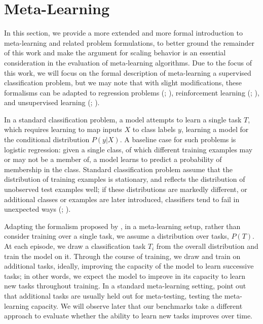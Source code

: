 \chapter{Meta-Learning\label{ch:meta-learning}}

In this section, we provide a more extended and more formal introduction to meta-learning and related problem formulations, to better ground the remainder of this work and make the argument for scaling behavior is an essential consideration in the evaluation of meta-learning algorithms. Due to the focus of this work, we will focus on the formal description of meta-learning a supervised classification problem, but we may note that with slight modifications, these formalisms can be adapted to regression problems (\cite{Finn2017}; \cite{Garg2016}), reinforcement learning (\cite{Wang2016}; \cite{Duan2017}), and unsupervised learning (\cite{Garg2018}; \cite{Hsu2019}).

In a standard classification problem, a model attempts to learn a single task $T$, which requires learning to map inputs $X$ to class labels $y$, learning a model for the conditional distribution $P(y | X)$. A baseline case for such problems is logistic regression: given a single class, of which different training examples may or may not be a member of, a model learns to predict a probability of membership in the class. Standard classification problem assume that the distribution of training examples is stationary, and reflects the distribution of unobserved test examples well; if these distributions are markedly different, or additional classes or examples are later introduced, classifiers tend to fail in unexpected ways (\cite{Amodei2016}; \cite{Hu2018}). 

Adapting the formalism proposed by \textcite{Finn2017}, in a meta-learning setup, rather than consider training over a single task, we assume a distribution over tasks, $P(T)$. At each episode, we draw a classification task $T_i$ from the overall distribution and train the model on it. Through the course of training, we draw and train on additional tasks, ideally, improving the capacity of the model to learn successive tasks; in other words, we expect the model to improve in its capacity to learn new tasks throughout training. In a standard meta-learning setting, \textcite{Finn2017} point out that additional tasks are usually held out for meta-testing, testing the meta-learning capacity. We will observe later that our benchmarks take a different approach to evaluate whether the ability to learn new tasks improves over time. 

